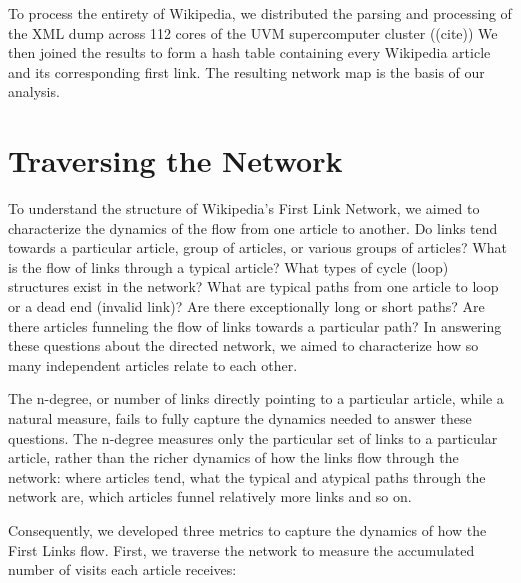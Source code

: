 \documentclass[twoside]{article}
\begin{document}
To process the entirety of Wikipedia, we distributed the parsing and processing of the XML dump
across 112 cores of the UVM supercomputer cluster
((cite))
We then joined the results to form a hash table containing every Wikipedia article and its corresponding
first link. The resulting network map is the basis of our analysis.


\section{Traversing the Network}

To understand the structure of Wikipedia's First Link Network, we
aimed to characterize the dynamics of the flow from one article to another. 
Do links tend towards a particular article, group of articles, or various groups of articles? 
What is the flow of links through a typical article?
What types of cycle (loop) structures exist in the network?
What are typical paths from one article to loop or a dead end (invalid link)? 
Are there exceptionally long or short paths? 
Are there articles funneling the flow of links towards a particular path?
In answering these questions about the directed network, we aimed to characterize 
how so many independent articles relate to each other.

The n-degree, or number of links directly pointing to a particular article,
while a natural measure, fails to fully capture the dynamics needed to answer these questions.
The n-degree measures only the particular set of links to a particular article, 
rather than the richer dynamics of how the links flow through the network: 
where articles tend, what the typical and atypical 
paths through the network are, which articles funnel relatively more links and so on. 

Consequently, we developed three metrics to capture the dynamics of how the First Links flow. 
First, we traverse the network to measure the accumulated number of visits each article receives: \\
\end{document}
